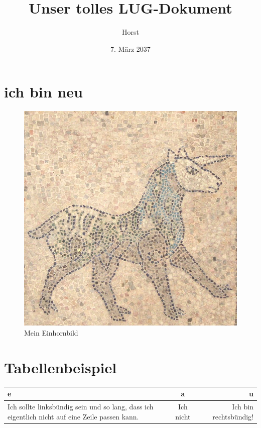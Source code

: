 \documentclass[a4paper, 11pt, twoside]{article}
\author{Horst}
\title{Unser tolles LUG-Dokument}
\date{7. März 2037}
\begin{document}
\maketitle

\newpage

\tableofcontents
\listoffigures


\newpage



\section{ich bin neu}

\begin{figure}[h]
\includegraphics[width=\textwidth]{einhorn.jpg}
\caption[Was anderes]{Mein Einhornbild}
\label{fig:Einhorn}
\end{figure}

\section{Tabellenbeispiel}

\begin{table}[h]
\begin{tabular}{|l|c|r|}
\hline
e & a & u\\
\hline
Ich sollte linksbündig sein und so lang, dass ich eigentlich nicht auf eine Zeile passen kann.& Ich nicht & Ich bin rechtsbündig! \\
\hline
\end{tabular}
\end{table}
\end{document}
